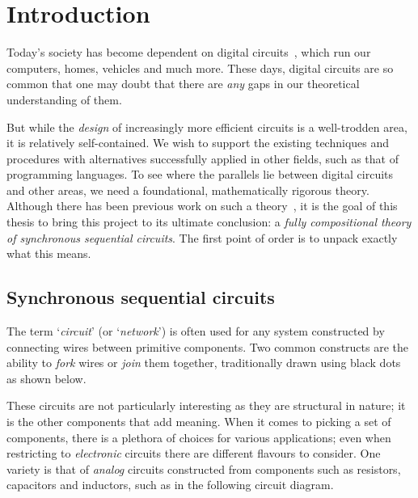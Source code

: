 \chapter{Introduction}

Today's society has become dependent on digital
circuits~\cite{katz2005contemporary}, which run our computers, homes, vehicles
and much more.
These days, digital circuits are so common that one may doubt that there are
\emph{any} gaps in our theoretical understanding of them.

But while the \emph{design} of increasingly more efficient circuits is a
well-trodden area, it is relatively self-contained.
We wish to support the existing techniques and procedures with alternatives
successfully applied in other fields, such as that of programming languages.
To see where the parallels lie between digital circuits and other areas,
we need a foundational, mathematically rigorous theory.
Although there has been previous work on such a
theory~\cite{lafont2003algebraic,ghica2017diagrammatic,ghica2018structural}, it
is the goal of this thesis to bring this project to its ultimate conclusion:
a \emph{fully compositional theory of synchronous sequential circuits}.
The first point of order is to unpack exactly what this means.

\section{Synchronous sequential circuits}

The term `\emph{circuit}' (or `\emph{network}') is often used for any system
constructed by connecting wires between primitive components.
Two common constructs are the ability to \emph{fork} wires or \emph{join} them
together, traditionally drawn using black dots as shown below.

\begin{center}
\end{center}

These circuits are not particularly interesting as they are structural in
nature; it is the other components that add meaning.
When it comes to picking a set of components, there is a plethora of choices
for various applications; even when restricting to \emph{electronic} circuits
there are different flavours to consider.
One variety is that of \emph{analog} circuits constructed from components such
as resistors, capacitors and inductors, such as in the following circuit
diagram.

